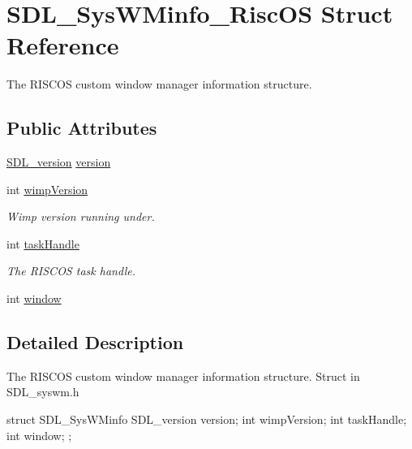 \hypertarget{struct_s_d_l___sys_w_minfo___risc_o_s}{
\section{SDL\_\-SysWMinfo\_\-RiscOS Struct Reference}
\label{struct_s_d_l___sys_w_minfo___risc_o_s}
}


The RISCOS custom window manager information structure.  


\subsection*{Public Attributes}
\begin{DoxyCompactItemize}
\item 
\hyperlink{struct_s_d_l__version}{SDL\_\-version} \hyperlink{struct_s_d_l___sys_w_minfo___risc_o_s_a76bfd4454ea03cb2bc72a7d31bdaab5b}{version}
\item 
int \hyperlink{struct_s_d_l___sys_w_minfo___risc_o_s_af9968cd4c4535dbec1bb2bb6b8cf2380}{wimpVersion}
\begin{DoxyCompactList}\small\item\em Wimp version running under. \item\end{DoxyCompactList}\item 
int \hyperlink{struct_s_d_l___sys_w_minfo___risc_o_s_a6cf640475e04efbf4f1162a3bb03b54c}{taskHandle}
\begin{DoxyCompactList}\small\item\em The RISCOS task handle. \item\end{DoxyCompactList}\item 
int \hyperlink{struct_s_d_l___sys_w_minfo___risc_o_s_a7052e68f3653245d003ffb23b2d59517}{window}
\end{DoxyCompactItemize}


\subsection{Detailed Description}
The RISCOS custom window manager information structure. Struct in SDL\_\-syswm.h 
\begin{DoxyCode}
            struct SDL_SysWMinfo {
                SDL_version version;
                int wimpVersion;
            int taskHandle;
            int window;
            };          
\end{DoxyCode}
  

